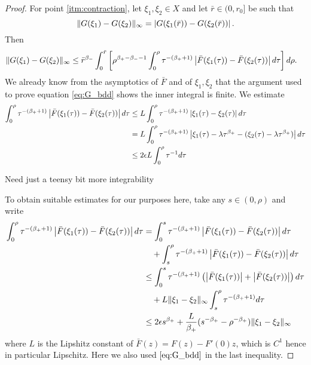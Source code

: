 \documentclass{amsart}
\begin{document}
\begin{proof}
For point \ref{itm:contraction}, let \(\xi_1, \xi_2 \in X\) and let \(\bar{r} \in (0, r_0]\) be such that
\[
\|G(\xi_1) - G(\xi_2)\|_{\infty} = \left|{G(\xi_1(\bar{r})) - G(\xi_2(\bar{r}))}\right|.
\]
Then
\[
\begin{split}
\|G(\xi_1) - G(\xi_2)\|_{\infty} &\leq \bar{r}^{\beta_-} \int_0^{\bar{r}} \left[\rho^{\beta_+ - \beta_- - 1} \int_0^{\rho} \tau^{-(\beta_+ + 1)} \left|{\bar{F}(\xi_1(\tau)) - \bar{F}(\xi_2(\tau))}\right| d\tau\right] d\rho.
\end{split}
\]
We already know from the asymptotics of \(\bar{F}\) and of \(\xi_1, \xi_2\) that the argument used to prove equation \eqref{eq:G_bdd} shows the inner integral is finite. We estimate
\[
\begin{split}
\int_0^{\rho} \tau^{-(\beta_+ + 1)} \left|{\bar{F}(\xi_1(\tau)) - \bar{F}(\xi_2(\tau))}\right| d\tau &\leq L \int_0^{\rho} \tau^{-(\beta_+ + 1)} \left|{\xi_1(\tau) - \xi_2(\tau)}\right| d\tau \\
&= L \int_0^{\rho} \tau^{-(\beta_+ + 1)} \left|{\xi_1(\tau) - \lambda \tau^{\beta_+} - (\xi_2(\tau) - \lambda \tau^{\beta_+})}\right| d\tau \\
&\leq 2 \epsilon L \int_0^{\rho} \tau^{-1} d\tau \\
\end{split}
\]

{\color{red} Need just a teensy bit more integrability}

To obtain suitable estimates for our purposes here, take any \(s \in (0, \rho)\) and write
\[
\begin{split}
\int_0^{\rho} \tau^{-(\beta_+ + 1)} \left|{\bar{F}(\xi_1(\tau)) - \bar{F}(\xi_2(\tau))}\right| d\tau &= \int_0^{s} \tau^{-(\beta_+ + 1)} \left|{\bar{F}(\xi_1(\tau)) - \bar{F}(\xi_2(\tau))}\right| d\tau \\
&\quad + \int_s^{\rho} \tau^{-(\beta_+ + 1)} \left|{\bar{F}(\xi_1(\tau)) - \bar{F}(\xi_2(\tau))}\right| d\tau \\
&\leq \int_0^{s} \tau^{-(\beta_+ + 1)} \left(\left|{\bar{F}(\xi_1(\tau))}\right| + \left|{\bar{F}(\xi_2(\tau))}\right|\right) d\tau \\
&\quad + L \|\xi_1 - \xi_2\|_{\infty} \int_s^{\rho} \tau^{-(\beta_+ + 1)} d\tau \\
&\leq 2\epsilon s^{\beta_+} + \frac{L}{\beta_+}(s^{-\beta_+} - \rho^{-\beta_+}) \|\xi_1 - \xi_2\|_{\infty}
\end{split}
\]
where \(L\) is the Lipshitz constant of \(\bar{F}(z) = F(z) - F'(0) z\), which is \(C^1\) hence in particular Lipschitz. Here we also used \(\eqref{eq:G_bdd}\) in the last inequality.


\end{proof}
\end{document}
